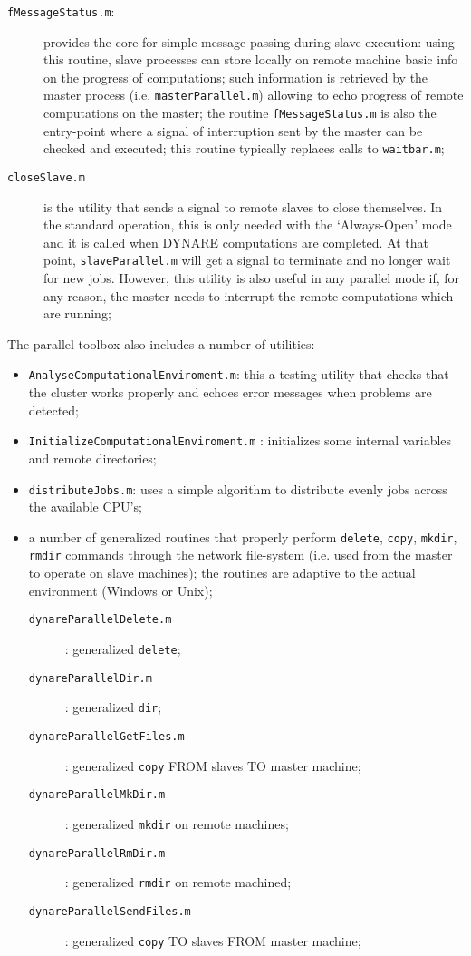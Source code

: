 \documentclass[12pt,a4paper,pdftex]{article}
\begin{document}
\begin{description}
 \item[\texttt{fMessageStatus.m}:] provides the core for simple message passing during slave execution: using this routine, slave processes can store locally on remote machine basic info on the progress of computations; such information is retrieved by the master process (i.e. \verb"masterParallel.m") allowing to echo progress of remote computations on the master; the routine \verb"fMessageStatus.m" is also the entry-point where a signal of interruption sent by the master can be checked and executed; this routine typically replaces calls to \verb"waitbar.m";
 \item[\texttt{closeSlave.m}] is the utility that sends a signal to remote slaves to close themselves. In the standard operation, this is only needed with the `Always-Open' mode and it is called when DYNARE computations are completed. At that point, \texttt{slaveParallel.m} will get a signal to terminate and no longer wait for new jobs. However, this utility is also useful in any parallel mode if, for any reason, the master needs to interrupt the remote computations which are running;
 \end{description}

The parallel toolbox also includes a number of utilities:
\begin{itemize}
 \item \verb"AnalyseComputationalEnviroment.m": this a testing utility that checks that the cluster works properly and echoes error messages when problems are detected;
 \item \verb"InitializeComputationalEnviroment.m" : initializes some internal variables and remote directories;
 \item \verb"distributeJobs.m": uses a simple algorithm to distribute evenly jobs across the available CPU's;
 \item a number of generalized routines that properly perform \verb"delete", \verb"copy", \verb"mkdir", \verb"rmdir" commands through the network file-system (i.e. used from the master to operate on slave machines); the routines are adaptive to the actual environment (Windows or Unix);
 \begin{description}
  \item[\texttt{dynareParallelDelete.m}]: generalized \verb"delete";
  \item[\texttt{dynareParallelDir.m}]: generalized \verb"dir";
  \item[\texttt{dynareParallelGetFiles.m}]: generalized \verb"copy" FROM slaves TO master machine;
  \item[\texttt{dynareParallelMkDir.m}]: generalized \verb"mkdir" on remote machines;
  \item[\texttt{dynareParallelRmDir.m}]: generalized \verb"rmdir" on remote machined;
  \item[\texttt{dynareParallelSendFiles.m}]: generalized \verb"copy" TO slaves FROM master machine;
 \end{description}
\end{itemize}
\end{document}
